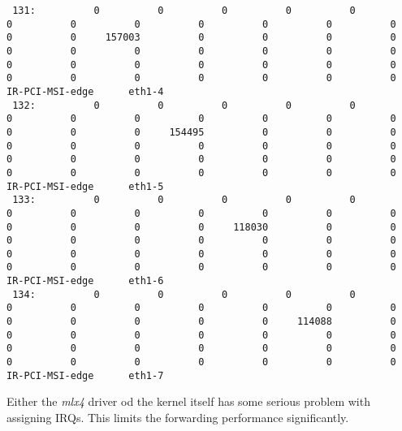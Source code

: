 \begin{lstlisting}
 131:          0          0          0          0          0          0          0          0          0          0          0          0          0          0     157003          0          0          0          0          0          0          0          0          0          0          0          0          0          0          0          0          0          0          0          0          0          0          0          0          0  IR-PCI-MSI-edge      eth1-4
 132:          0          0          0          0          0          0          0          0          0          0          0          0          0          0          0     154495          0          0          0          0          0          0          0          0          0          0          0          0          0          0          0          0          0          0          0          0          0          0          0          0  IR-PCI-MSI-edge      eth1-5
 133:          0          0          0          0          0          0          0          0          0          0          0          0          0          0          0          0     118030          0          0          0          0          0          0          0          0          0          0          0          0          0          0          0          0          0          0          0          0          0          0          0  IR-PCI-MSI-edge      eth1-6
 134:          0          0          0          0          0          0          0          0          0          0          0          0          0          0          0          0          0     114088          0          0          0          0          0          0          0          0          0          0          0          0          0          0          0          0          0          0          0          0          0          0  IR-PCI-MSI-edge      eth1-7
\end{lstlisting}

Either the {\it{mlx4}} driver od the kernel itself has some serious problem with assigning IRQs.
This limits the forwarding performance significantly.
